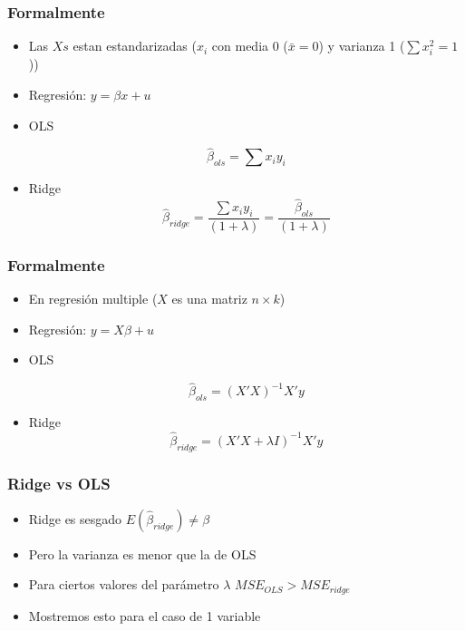 \documentclass[
  shownotes,
  xcolor={svgnames},
  hyperref={colorlinks,citecolor=DarkBlue,linkcolor=andesred,urlcolor=DarkBlue}
  , aspectratio=169]{beamer}
\begin{document}
\begin{frame}[fragile]
\frametitle{Formalmente}



\begin{itemize}
  \item Las $Xs$ estan estandarizadas ($x_i$ con media 0 ($\bar{x}=0$) y varianza 1 ($\sum x^2_i=1$))
  \medskip
  \item Regresión: $y= \beta x + u$ 
  \medskip
  \item OLS 
  
        \begin{equation*}
          \hat{\beta}_{ols}=\sum x_iy_i
        \end{equation*}
        \medskip
  
  \item Ridge 
  \begin{equation*}
          \hat{\beta}_{ridge}=\frac{\sum x_iy_i}{(1+\lambda)}=\frac{\hat{\beta}_{ols}}{(1+\lambda)}
        \end{equation*}

\end{itemize}
\end{frame}
\begin{frame}[fragile]
\frametitle{Formalmente}

\begin{itemize}
    \item En regresión multiple ($X$ es una matriz $n\times k$)
    \medskip
\item Regresión: $y= X \beta   + u$ 
  \medskip
  \item OLS 
  
        \begin{equation*}
          \hat{\beta}_{ols}= (X'X)^{-1}X'y
        \end{equation*}
        \medskip
  
  \item Ridge 
  \begin{equation*}
          \hat{\beta}_{ridge}= (X'X+ \lambda I)^{-1}X'y
        \end{equation*}

\end{itemize}
\end{frame}
\begin{frame}[fragile]
\frametitle{Ridge vs OLS}
 
\bigskip
\begin{itemize}
  \item Ridge es sesgado $E(\hat{\beta}_{ridge}) \neq \beta$
  \medskip
  \item Pero la varianza es menor que la de OLS
  \medskip
  \item Para ciertos valores del parámetro $\lambda$ $MSE_{OLS}>MSE_{ridge}$
  \medskip
  \item Mostremos esto para el caso de 1 variable
\end{itemize}

\end{frame}
\end{document}
